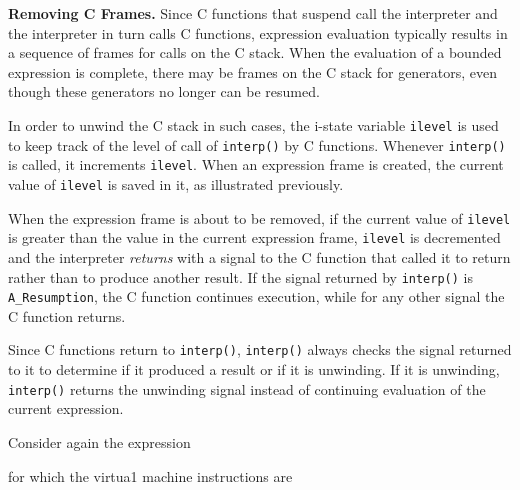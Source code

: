 \textbf{Removing C Frames.} Since C functions that suspend call the
interpreter and the interpreter in turn calls C functions, expression
evaluation typically results in a sequence of frames for calls on the
C stack. When the evaluation of a bounded expression is complete,
there may be frames on the C stack for generators, even though these
generators no longer can be resumed.

In order to {\textquotedbl}unwind{\textquotedbl} the C stack in such
cases, the i-state variable \texttt{ilevel} is used to keep track of
the level of call of \texttt{interp()} by C functions. Whenever
\texttt{interp()} is called, it increments \texttt{ilevel}. When an
expression frame is created, the current value of \texttt{ilevel} is
saved in it, as illustrated previously.

When the expression frame is about to be removed, if the current value
of \texttt{ilevel} is greater than the value in the current expression
frame, \texttt{ilevel} is decremented and the interpreter
\textit{returns }with a signal to the C function that called it to
return rather than to produce another result. If the signal returned
by \texttt{interp()} is \texttt{A\_Resumption}, the C function
continues execution, while for any other signal the C function
returns.

Since C functions return to \texttt{interp()}, \texttt{interp()}
always checks the signal returned to it to determine if it produced a
result or if it is unwinding. If it is unwinding, \texttt{interp()}
returns the unwinding signal instead of continuing evaluation
of\textit{ }the current expression.

Consider again the expression


\noindent for which the virtua1 machine instructions are

\goodbreak
{}



